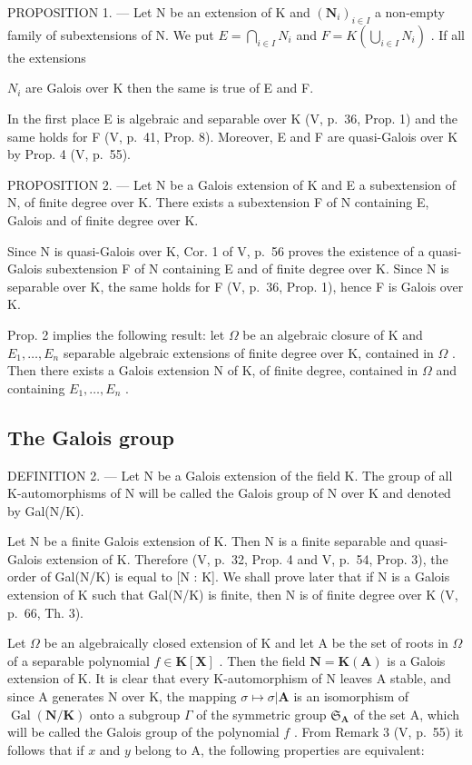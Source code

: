 PROPOSITION 1. --- Let N be an extension of K and \((\mathbf{N}_{i})_{i\in I}\) a non-empty family of subextensions of N. We put \(E=\bigcap_{i\in I}N_{i}\) and \(F=K\left(\bigcup_{i\in I}N_{i}\right)\) . If all the extensions

\(N_{i}\) are Galois over K then the same is true of E and F.

In the first place E is algebraic and separable over K (V, p.~36, Prop. 1) and the same holds for F (V, p.~41, Prop. 8). Moreover, E and F are quasi-Galois over K by Prop. 4 (V, p.~55).

PROPOSITION 2. --- Let N be a Galois extension of K and E a subextension of N, of finite degree over K. There exists a subextension F of N containing E, Galois and of finite degree over K.

Since N is quasi-Galois over K, Cor. 1 of V, p.~56 proves the existence of a quasi-Galois subextension F of N containing E and of finite degree over K. Since N is separable over K, the same holds for F (V, p.~36, Prop. 1), hence F is Galois over K.

Prop. 2 implies the following result: let \(\Omega\) be an algebraic closure of K and \(E_1, \ldots, E_n\) separable algebraic extensions of finite degree over K, contained in \(\Omega\) . Then there exists a Galois extension N of K, of finite degree, contained in \(\Omega\) and containing \(E_1, \ldots, E_n\) .

\subsection{The Galois group}

DEFINITION 2. --- Let N be a Galois extension of the field K. The group of all K-automorphisms of N will be called the Galois group of N over K and denoted by Gal(N/K).

Let N be a finite Galois extension of K. Then N is a finite separable and quasi-Galois extension of K. Therefore (V, p.~32, Prop. 4 and V, p.~54, Prop. 3), the order of Gal(N/K) is equal to {[}N : K{]}. We shall prove later that if N is a Galois extension of K such that Gal(N/K) is finite, then N is of finite degree over K (V, p.~66, Th. 3).

Let \(\Omega\) be an algebraically closed extension of K and let A be the set of roots in \(\Omega\) of a separable polynomial \(f \in \mathbf{K}[\mathbf{X}]\) . Then the field \(\mathbf{N} = \mathbf{K}(\mathbf{A})\) is a Galois extension of K. It is clear that every K-automorphism of N leaves A stable, and since A generates N over K, the mapping \(\sigma \mapsto \sigma | \mathbf{A}\) is an isomorphism of \(\operatorname{Gal}(\mathbf{N} / \mathbf{K})\) onto a subgroup \(\Gamma\) of the symmetric group \(\mathfrak{S}_{\mathbf{A}}\) of the set A, which will be called the Galois group of the polynomial \(f\) . From Remark 3 (V, p.~55) it follows that if \(x\) and \(y\) belong to A, the following properties are equivalent:


